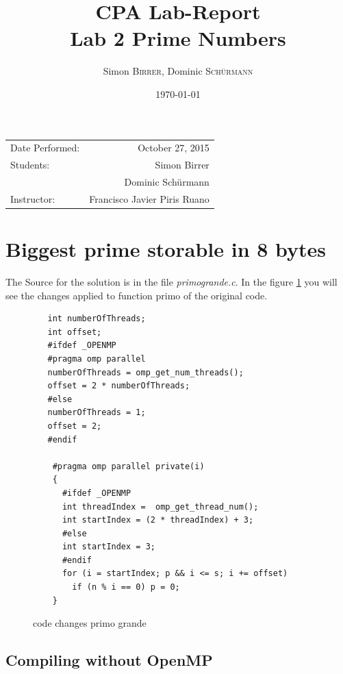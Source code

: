 \documentclass[11pt,a4paper]{article}
\title{CPA Lab-Report \\ Lab 2 Prime Numbers} %
\author{Simon \textsc{Birrer}, Dominic \textsc{Sch\"urmann}} %
\date{\today} %
\begin{document}
\maketitle %

\begin{center}
\begin{tabular}{l r}
Date Performed: & October 27, 2015 \\ %
Students: & Simon Birrer \\ %
& Dominic Sch\"urmann \\
Instructor: & Francisco Javier Piris Ruano %
\end{tabular}
\end{center}

\bigskip

\tableofcontents

\pagebreak

\section{Biggest prime storable in 8 bytes}

The Source for the solution is in the file \textit{primo\textunderscore  grande.c}. In the figure \ref{fig:code_primogrande} you will see the changes applied to function primo of the original code.


\begin{figure}[h]
\begin{lstlisting}
   int numberOfThreads;
   int offset;
   #ifdef _OPENMP
   #pragma omp parallel
   numberOfThreads = omp_get_num_threads();
   offset = 2 * numberOfThreads;
   #else
   numberOfThreads = 1;
   offset = 2;
   #endif
    
    #pragma omp parallel private(i)
    {
      #ifdef _OPENMP
      int threadIndex =  omp_get_thread_num();
      int startIndex = (2 * threadIndex) + 3;
      #else
      int startIndex = 3;
      #endif
      for (i = startIndex; p && i <= s; i += offset)
        if (n % i == 0) p = 0;          
    }
\end{lstlisting} 
\caption{code changes primo grande}
\label{fig:code_primogrande}
\end{figure}


\subsection{Compiling without OpenMP}
\end{document}
